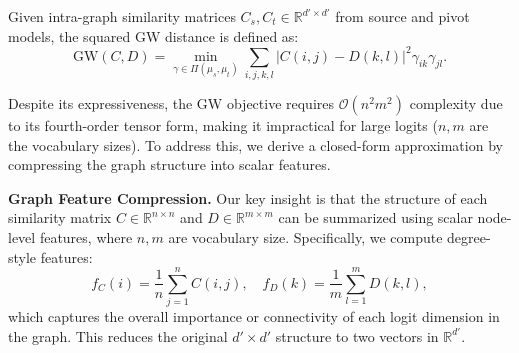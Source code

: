 \documentclass{article}
\begin{document}


Given intra-graph similarity matrices $C_s, C_t \in \mathbb{R}^{d' \times d'}$ from source and pivot models, the squared GW distance is defined as:
\begin{equation}
\text{GW}(C, D) = \min_{\gamma \in \Pi(\mu_s, \mu_t)} \sum_{i,j,k,l} |C(i,j) - D(k,l)|^2 \gamma_{ik} \gamma_{jl}.
\end{equation}

Despite its expressiveness, the GW objective requires $\mathcal{O}(n^2 m^2)$ complexity due to its fourth-order tensor form, making it impractical for large logits ($n,m$ are the vocabulary sizes). To address this, we derive a closed-form approximation by compressing the graph structure into scalar features.

\textbf{Graph Feature Compression.}
Our key insight is that the structure of each similarity matrix $C \in \mathbb{R}^{n \times n}$ and $D \in \mathbb{R}^{m \times m}$ can be summarized using scalar node-level features, where $n, m$ are vocabulary size. Specifically, we compute degree-style features:
\begin{equation}
f_C(i) = \frac{1}{n} \sum_{j=1}^{n} C(i, j), \quad
f_D(k) = \frac{1}{m} \sum_{l=1}^{m} D(k, l),
\end{equation}
which captures the overall importance or connectivity of each logit dimension in the graph. This reduces the original $d' \times d'$ structure to two vectors in $\mathbb{R}^{d'}$.
\end{document}
